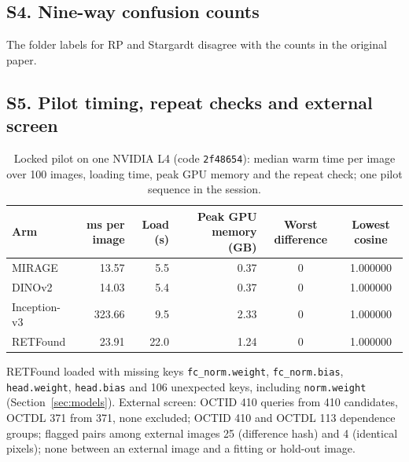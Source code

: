 \subsection*{S4. Nine-way confusion counts}
\begin{table}[!htbp]
\caption{Nine-way confusion counts (rows: true class; columns: assigned class, in the order NORMAL, CNV, DME, DRUSEN, CSC, MH, MacTel, Stargardt\fnRS, RP\fnRS). ``Kermany + hold-out'': the 1,000 Kermany test images and the 22 hold-out rare images. Empty true rows are dropped.}
\label{tab:confusion}
\centering\scriptsize
\setlength{\tabcolsep}{3.5pt}

\par\smallskip
\parbox{\textwidth}{\footnotesize \fnRS The folder labels for RP and Stargardt disagree with the counts in the original paper.}
\end{table}

\clearpage
\subsection*{S5. Pilot timing, repeat checks and external screen}
\begin{table}[!htbp]
\caption{Locked pilot on one NVIDIA L4 (code \texttt{2f48654}): median warm time per image over 100 images, loading time, peak GPU memory and the repeat check; one pilot sequence in the session.}
\label{tab:pilot}
\centering\footnotesize
\begin{tabular}{@{}lrrrcc@{}}
\toprule
Arm & ms per image & Load (s) & Peak GPU memory (GB) & Worst difference & Lowest cosine \\
\midrule
MIRAGE & 13.57 & 5.5 & 0.37 & 0 & 1.000000 \\
DINOv2 & 14.03 & 5.4 & 0.37 & 0 & 1.000000 \\
Inception-v3 & 323.66 & 9.5 & 2.33 & 0 & 1.000000 \\
RETFound & 23.91 & 22.0 & 1.24 & 0 & 1.000000 \\
\bottomrule
\end{tabular}
\par\smallskip
\parbox{\textwidth}{\footnotesize RETFound loaded with missing keys \texttt{fc\_norm.weight}, \texttt{fc\_norm.bias}, \texttt{head.weight}, \texttt{head.bias} and 106 unexpected keys, including \texttt{norm.weight} (Section~\ref{sec:models}). External screen: OCTID 410 queries from 410 candidates, OCTDL 371 from 371, none excluded; OCTID 410 and OCTDL 113 dependence groups; flagged pairs among external images 25 (difference hash) and 4 (identical pixels); none between an external image and a fitting or hold-out image.}
\end{table}


